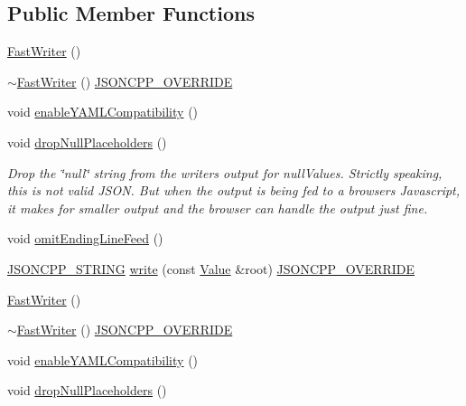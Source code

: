 \subsection*{Public Member Functions}
\begin{DoxyCompactItemize}
\item 
\hyperlink{class_json_1_1_fast_writer_a1bbc73ce1a1cc7b09cd1e02db3905170}{Fast\+Writer} ()
\item 
\hyperlink{class_json_1_1_fast_writer_a34152eac509fe00c9b2e15ce2fc94ab8}{$\sim$\+Fast\+Writer} () \hyperlink{config_8h_a824d6199c91488107e443226fa6022c5}{J\+S\+O\+N\+C\+P\+P\+\_\+\+O\+V\+E\+R\+R\+I\+DE}
\item 
void \hyperlink{class_json_1_1_fast_writer_a78d98e9f76d33660ad6e6a1abe287d45}{enable\+Y\+A\+M\+L\+Compatibility} ()
\item 
void \hyperlink{class_json_1_1_fast_writer_a6e93d8dce951e408517311026a065b40}{drop\+Null\+Placeholders} ()
\begin{DoxyCompactList}\small\item\em Drop the \char`\"{}null\char`\"{} string from the writer\textquotesingle{}s output for null\+Values. Strictly speaking, this is not valid J\+S\+ON. But when the output is being fed to a browser\textquotesingle{}s Javascript, it makes for smaller output and the browser can handle the output just fine. \end{DoxyCompactList}\item 
void \hyperlink{class_json_1_1_fast_writer_af4ee077d365d75941fb2688d97207a55}{omit\+Ending\+Line\+Feed} ()
\item 
\hyperlink{config_8h_a1e723f95759de062585bc4a8fd3fa4be}{J\+S\+O\+N\+C\+P\+P\+\_\+\+S\+T\+R\+I\+NG} \hyperlink{class_json_1_1_fast_writer_a93d45ba4bc312371d08beb3e3dfbe654}{write} (const \hyperlink{class_json_1_1_value}{Value} \&root) \hyperlink{config_8h_a824d6199c91488107e443226fa6022c5}{J\+S\+O\+N\+C\+P\+P\+\_\+\+O\+V\+E\+R\+R\+I\+DE}
\item 
\hyperlink{class_json_1_1_fast_writer_a1bbc73ce1a1cc7b09cd1e02db3905170}{Fast\+Writer} ()
\item 
\hyperlink{class_json_1_1_fast_writer_a34152eac509fe00c9b2e15ce2fc94ab8}{$\sim$\+Fast\+Writer} () \hyperlink{config_8h_a824d6199c91488107e443226fa6022c5}{J\+S\+O\+N\+C\+P\+P\+\_\+\+O\+V\+E\+R\+R\+I\+DE}
\item 
void \hyperlink{class_json_1_1_fast_writer_a78d98e9f76d33660ad6e6a1abe287d45}{enable\+Y\+A\+M\+L\+Compatibility} ()
\item 
void \hyperlink{class_json_1_1_fast_writer_a6e93d8dce951e408517311026a065b40}{drop\+Null\+Placeholders} ()

\end{DoxyCompactItemize}
